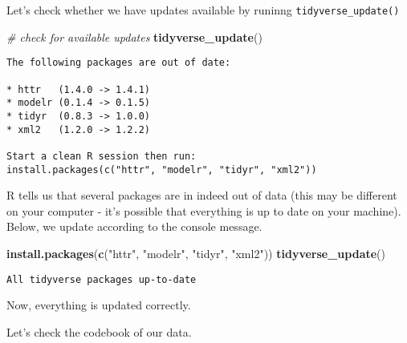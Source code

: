 \documentclass[]{article}
\newenvironment{Shaded}{\begin{snugshade}}{\end{snugshade}}
\newcommand{\CommentTok}[1]{\textcolor[rgb]{0.56,0.35,0.01}{\textit{#1}}}
\newcommand{\KeywordTok}[1]{\textcolor[rgb]{0.13,0.29,0.53}{\textbf{#1}}}
\newcommand{\NormalTok}[1]{#1}
\newcommand{\StringTok}[1]{\textcolor[rgb]{0.31,0.60,0.02}{#1}}
\begin{document}
Let's check whether we have updates available by runinng \texttt{tidyverse\_update()}

\begin{Shaded}
\begin{Highlighting}[]
\CommentTok{# check for available updates}
\KeywordTok{tidyverse_update}\NormalTok{()}
\end{Highlighting}
\end{Shaded}

\begin{verbatim}
The following packages are out of date:
  
* httr   (1.4.0 -> 1.4.1)
* modelr (0.1.4 -> 0.1.5)
* tidyr  (0.8.3 -> 1.0.0)
* xml2   (1.2.0 -> 1.2.2)

Start a clean R session then run:
install.packages(c("httr", "modelr", "tidyr", "xml2"))
\end{verbatim}

R tells us that several packages are in indeed out of data (this may be different on your computer - it's possible that everything is up to date on your machine). Below, we update according to the console message.

\begin{Shaded}
\begin{Highlighting}[]
\KeywordTok{install.packages}\NormalTok{(}\KeywordTok{c}\NormalTok{(}\StringTok{"httr"}\NormalTok{, }\StringTok{"modelr"}\NormalTok{, }\StringTok{"tidyr"}\NormalTok{, }\StringTok{"xml2"}\NormalTok{))}
\KeywordTok{tidyverse_update}\NormalTok{()}
\end{Highlighting}
\end{Shaded}

\begin{verbatim}
All tidyverse packages up-to-date
\end{verbatim}

Now, everything is updated correctly.

Let's check the codebook of our data.
\end{document}
